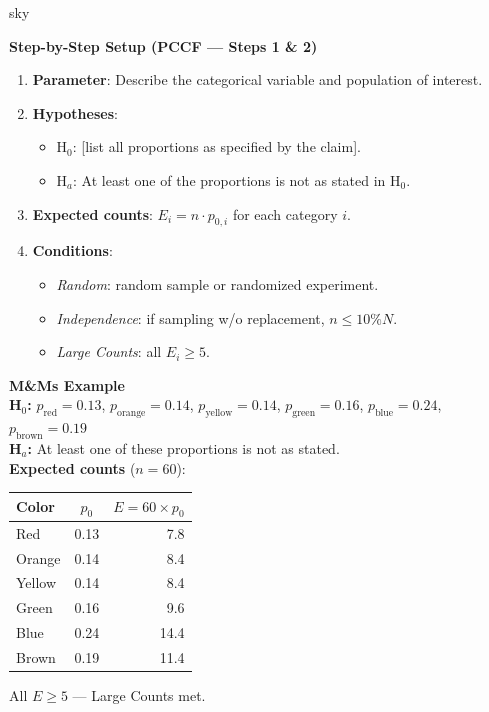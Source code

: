 \documentclass[10pt]{article}
\begin{document}
\begin{skillbox}{sky}
\begin{minipage}[t]{0.48\linewidth}
    \textbf{Step-by-Step Setup (PCCF --- Steps 1 \& 2)}
    \begin{enumerate}
        \item \textbf{Parameter}: Describe the categorical variable and population of
              interest.
        \item \textbf{Hypotheses}:
              \begin{itemize}
                  \item H$_0$: [list all proportions as specified by the claim].
                  \item H$_a$: At least one of the proportions is not as stated in H$_0$.
              \end{itemize}
        \item \textbf{Expected counts}: $E_i = n \cdot p_{0,i}$ for each category $i$.
        \item \textbf{Conditions}:
              \begin{itemize}
                  \item \textit{Random}: random sample or randomized experiment.
                  \item \textit{Independence}: if sampling w/o replacement, $n \le 10\%N$.
                  \item \textit{Large Counts}: all $E_i \ge 5$.
              \end{itemize}
    \end{enumerate}
\end{minipage}
\hfill
\begin{minipage}[t]{0.48\linewidth}
    \textbf{M\&Ms Example}\\[4pt]
    \textbf{H$_0$:} $p_\text{red} = 0.13$, $p_\text{orange} = 0.14$,
    $p_\text{yellow} = 0.14$, $p_\text{green} = 0.16$,
    $p_\text{blue} = 0.24$, $p_\text{brown} = 0.19$\\[4pt]
    \textbf{H$_a$:} At least one of these proportions is not as stated.\\[4pt]
    \textbf{Expected counts} ($n = 60$):
    \begin{center}\small
    \begin{tabular}{lcr}
        Color & $p_0$ & $E = 60 \times p_0$ \\
        \hline
        Red    & 0.13 & 7.8 \\
        Orange & 0.14 & 8.4 \\
        Yellow & 0.14 & 8.4 \\
        Green  & 0.16 & 9.6 \\
        Blue   & 0.24 & 14.4 \\
        Brown  & 0.19 & 11.4 \\
    \end{tabular}
    \end{center}
    All $E \ge 5$ --- Large Counts met.
\end{minipage}
\end{skillbox}
\end{document}
